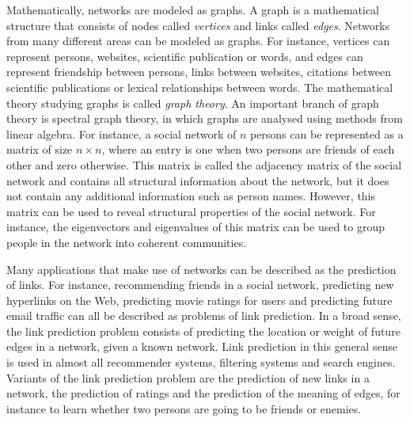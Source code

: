 \documentclass[11pt,a4paper]{book}
\begin{document}
Mathematically, networks are modeled as graphs.  
A graph is a mathematical structure that consists of nodes called
\emph{vertices} and links called \emph{edges}.  Networks from many
different areas can be modeled as graphs.  For instance, vertices can
represent persons, websites, scientific publication or words, and edges can
represent friendship between persons, links between websites, citations
between scientific publications or lexical relationships between words. 
The mathematical theory studying graphs is called \emph{graph theory}. 
An important branch of graph theory is spectral graph theory, in which
graphs are analysed using methods from linear algebra.  
For instance, a social network of $n$ persons can be represented as a
matrix of size $n\times n$, where an entry is one when two persons are
friends of each other and zero otherwise.  This matrix is called the
adjacency matrix of the social network and contains all
structural information about the network, but it does not contain
any additional information such as person names.  However, this matrix
can be used to reveal structural properties of the social network.  For
instance, the eigenvectors and eigenvalues of this matrix can be used to
group people in the network into coherent communities.  

Many applications that make use of networks can be described as
the prediction of links. 
For instance, recommending friends in a social network, predicting new
hyperlinks on the Web, predicting movie ratings for users and predicting
future email traffic can all be described as problems of link
prediction. 
In a broad sense, the link prediction problem consists of
predicting the location or weight of future edges in a network, given
a known network. 
Link prediction in this general sense is used in almost all recommender
systems, filtering systems and search engines.  Variants of the link
prediction problem are the prediction of new links in a network, the
prediction of ratings and the prediction of the meaning of edges, for
instance to learn whether two persons are going to be friends or enemies. 
\end{document}
